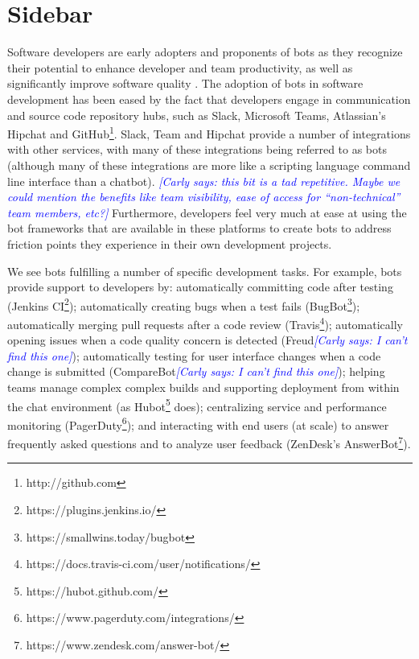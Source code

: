 \documentclass{sig-alternate}
\newcommand{\cl}[1]{\textcolor{blue}{{\it [Carly says: #1]}}}
\begin{document}
\section*{Sidebar}

Software developers are early adopters and proponents of bots as they recognize their potential to enhance developer and team productivity, as well as significantly improve software quality \cite{storey2016disrupting}. 
The adoption of bots in software development has been eased by the fact that developers engage in communication and source code repository hubs, such as Slack, Microsoft Teams, Atlassian's Hipchat and GitHub\footnote{http://github.com}.  Slack, Team and Hipchat provide a number of integrations with other services, with many of these integrations being referred to as bots (although many of these integrations are more like a scripting language command line interface than a chatbot). \cl{this bit is a tad repetitive. Maybe we could mention the benefits like team visibility, ease of access for ``non-technical'' team members, etc?}
Furthermore, developers feel very much at ease at using the bot frameworks that are available in these platforms to create bots to address friction points they experience in their own development projects. 
 
We see bots fulfilling a number of specific development tasks. For example, bots provide support to developers by:
automatically committing code after testing (Jenkins CI\footnote{https://plugins.jenkins.io/}); 
automatically creating bugs when a test fails (BugBot\footnote{https://smallwins.today/bugbot}); 
automatically merging pull requests after a code review (Travis\footnote{https://docs.travis-ci.com/user/notifications/}); 
automatically opening issues when a code quality concern is detected (Freud\cl{I can't find this one});
automatically testing for user interface changes when a code change is submitted (CompareBot\cl{I can't find this one}); 
helping teams manage complex complex builds and supporting deployment from within the chat environment (as Hubot\footnote{https://hubot.github.com/} does); 
centralizing service and performance monitoring (PagerDuty\footnote{https://www.pagerduty.com/integrations/}); 
and interacting with end users (at scale) to answer frequently asked questions and to analyze user feedback (ZenDesk's AnswerBot\footnote{https://www.zendesk.com/answer-bot/}).
\end{document}
